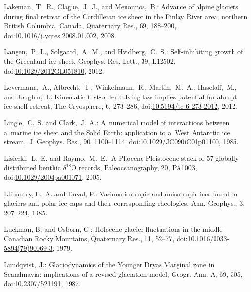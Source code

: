 \documentclass[tc, manuscript]{copernicus}
\begin{document}
\begin{thebibliography}{114}
Lakeman,~T.~R., Clague,~J.~J., and Menounos,~B.: Advance of alpine glaciers during final retreat of the Cordilleran ice sheet in the Finlay River area, northern British Columbia, Canada, Quaternary Res., 69, 188--200,
doi:\href{http://dx.doi.org/10.1016/j.yqres.2008.01.002}{10.1016/j.yqres.2008.01.002}, 2008.


Langen,~P.~L., Solgaard,~A.~M., and Hvidberg,~C.~S.: Self-inhibiting growth of the Greenland ice sheet, Geophys. Res. Lett., 39, L12502,
doi:\href{http://dx.doi.org/10.1029/2012GL051810}{10.1029/2012GL051810}, 2012.


 Levermann,~A., Albrecht,~T., Winkelmann,~R., Martin,~M.~A., Haseloff,~M., and Joughin,~I.: Kinematic first-order calving law implies potential for  abrupt ice-shelf retreat, The Cryosphere, 6, 273--286,
doi:\href{http://dx.doi.org/10.5194/tc-6-273-2012}{10.5194/tc-6-273-2012}, 2012.


Lingle,~C.~S. and Clark,~J.~A.: A~numerical model of interactions between a~marine ice sheet and the Solid Earth: application to a~West Antarctic ice stream,~J. Geophys. Res., 90, 1100--1114,
doi:\href{http://dx.doi.org/10.1029/JC090iC01p01100}{10.1029/JC090iC01p01100}, 1985.


Lisiecki,~L.~E. and Raymo,~M.~E.: A Pliocene-Pleistocene stack of 57 globally distributed benthic $\delta^{18}$O records, Paleoceanography, 20, PA1003,
doi:\href{http://dx.doi.org/10.1029/2004pa001071}{10.1029/2004pa001071}, 2005.


Lliboutry, L.~A. and Duval, P.: Various isotropic and anisotropic ices found in glaciers and polar ice caps and their corresponding rheologies, Ann. Geophys., 3, 207--224, 1985.


Luckman, B. and Osborn, G.: Holocene glacier fluctuations in the middle Canadian Rocky Mountains, Quaternary Res., 11, 52--77,
doi:\href{http://dx.doi.org/10.1016/0033-5894(79)90069-3}{10.1016/0033-5894(79)90069-3}, 1979.


Lundqvist,~J.: Glaciodynamics of the Younger Dryas Marginal zone in Scandinavia: implications of a revised glaciation model, Geogr. Ann. A, 69, 305,
doi:\href{http://dx.doi.org/10.2307/521191}{10.2307/521191}, 1987.



\end{thebibliography}
\end{document}
